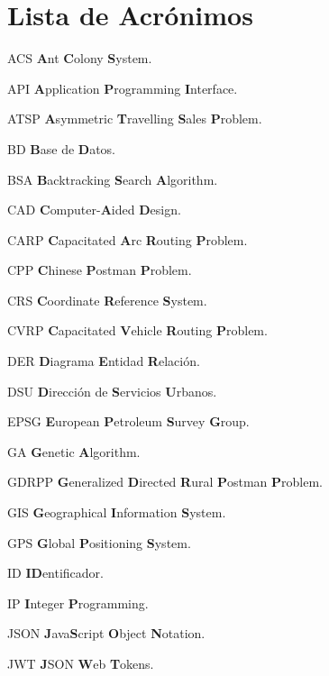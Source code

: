 \chapter*{Lista de Acrónimos\hfill}
\begin{abbreviations}
    \item[ACS] \textbf{A}nt \textbf{C}olony \textbf{S}ystem.
    \item[API] \textbf{A}pplication \textbf{P}rogramming \textbf{I}nterface.
    \item[ATSP] \textbf{A}symmetric \textbf{T}ravelling \textbf{S}ales \textbf{P}roblem.
    \item[BD] \textbf{B}ase de \textbf{D}atos.
    \item[BSA] \textbf{B}acktracking \textbf{S}earch \textbf{A}lgorithm.
    \item[CAD] \textbf{C}omputer-\textbf{A}ided \textbf{D}esign.
    \item[CARP] \textbf{C}apacitated \textbf{A}rc \textbf{R}outing \textbf{P}roblem.
    \item[CPP] \textbf{C}hinese \textbf{P}ostman \textbf{P}roblem.
    \item[CRS] \textbf{C}oordinate \textbf{R}eference \textbf{S}ystem.
    \item[CVRP] \textbf{C}apacitated \textbf{V}ehicle \textbf{R}outing \textbf{P}roblem.
    \item[DER] \textbf{D}iagrama \textbf{E}ntidad \textbf{R}elación.
    \item[DSU] \textbf{D}irección de \textbf{S}ervicios \textbf{U}rbanos.
    \item[EPSG] \textbf{E}uropean \textbf{P}etroleum \textbf{S}urvey \textbf{G}roup.
    \item[GA] \textbf{G}enetic \textbf{A}lgorithm.
    \item[GDRPP] \textbf{G}eneralized \textbf{D}irected \textbf{R}ural \textbf{P}ostman \textbf{P}roblem.
    \item[GIS] \textbf{G}eographical \textbf{I}nformation \textbf{S}ystem.
    \item[GPS] \textbf{G}lobal \textbf{P}ositioning \textbf{S}ystem.
    \item[ID] \textbf{ID}entificador.
    \item[IP] \textbf{I}nteger \textbf{P}rogramming.
    \item[JSON] \textbf{J}ava\textbf{S}cript \textbf{O}bject \textbf{N}otation.
    \item[JWT] \textbf{J}SON \textbf{W}eb \textbf{T}okens.

\end{abbreviations}
